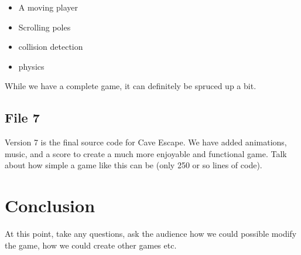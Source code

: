 \documentclass[12pt]{article}
\begin{document}
\begin{itemize}
\item A moving player
\item Scrolling poles
\item collision detection
\item physics
\end{itemize}

While we have a complete game, it can definitely be spruced up a bit.

\subsection*{File 7}
Version 7 is the final source code for Cave Escape. We have added animations, music, and a score to create a much more enjoyable and functional game.
Talk about how simple a game like this can be (only 250 or so lines of code).

\section*{Conclusion}
At this point, take any questions, ask the audience how we could possible modify the game, how we could create other games etc.
\end{document}
